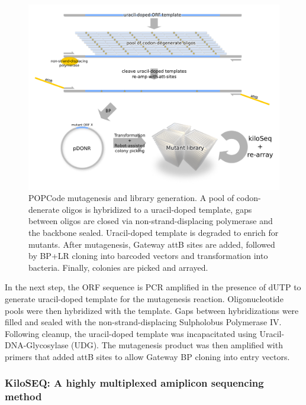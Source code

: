 \begin{figure}[h!]
	\centering
	\includegraphics[width=\textwidth]{img/popcode_schema.pdf}%
	\caption{POPCode mutagenesis and library generation. A pool of codon-denerate oligos is hybridized to a uracil-doped template, gaps between oligos are closed via non-strand-displacing polymerase and the backbone sealed. Uracil-doped template is degraded to enrich for mutants. After mutagenesis, Gateway attB sites are added, followed by BP+LR cloning into barcoded vectors and transformation into bacteria. Finally, colonies are picked and arrayed.}
	\label{fig:popcode_schema}
\end{figure}


In the next step, the ORF sequence is PCR amplified in the presence of dUTP to generate uracil-doped template for the mutagenesis reaction. Oligonucleotide pools were then hybridized with the template. Gaps between hybridizations were filled and sealed with the non-strand-displacing Sulpholobus Polymerase IV. Following cleanup, the uracil-doped template was incapacitated using Uracil-DNA-Glycosylase (UDG). The mutagenesis product was then amplified with primers that added attB sites to allow Gateway BP cloning into entry vectors.

\subsubsection{KiloSEQ: A highly multiplexed amiplicon sequencing method}

